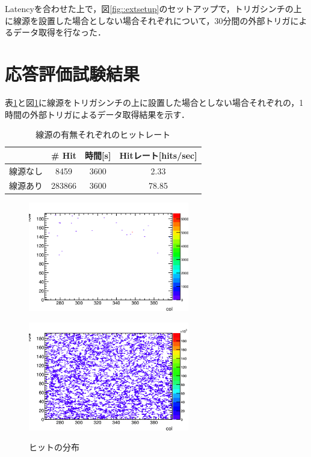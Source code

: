 Latencyを合わせた上で，図\ref{fig::extsetup}のセットアップで，トリガシンチの上に線源を設置した場合としない場合それぞれについて，30分間の外部トリガによるデータ取得を行なった．

\section{応答評価試験結果}
\label{sec:extconc}
表\ref{tab:ext}と図\ref{fig:ext}に線源をトリガシンチの上に設置した場合としない場合それぞれの，1時間の外部トリガによるデータ取得結果を示す．
\begin{table}[h]
  \centering
  \caption{線源の有無それぞれのヒットレート}
  \begin{tabular} {|l|c|c||c|} \hline
     & \# Hit & 時間[s] & Hitレート[hits/sec] \\  \hline
    線源なし & 8459 & 3600 & 2.33 \\ 
    線源あり & 283866 & 3600 & 78.85 \\ \hline
  \end{tabular}
  \label{tab:ext}
\end{table}

\begin{figure}[h]
  \centering
  \begin{minipage}[b]{0.45\linewidth}
    \centering
    \includegraphics[width=7cm]{./figure/exttrigwo.png}
    \label{fig:extwo}
  \end{minipage}
  \begin{minipage}[b]{0.45\linewidth}
    \centering
    \includegraphics[width=7cm]{./figure/exttrigw.png}
    \label{fig:extw}
  \end{minipage}
  \caption{ヒットの分布}
  \label{fig:ext}
\end{figure}

